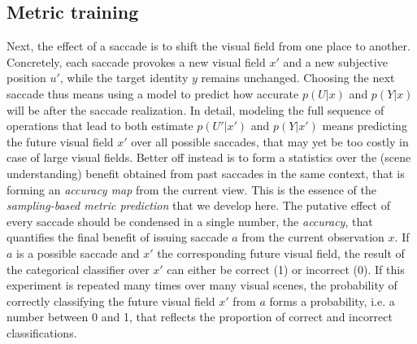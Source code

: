 \subsection*{Metric training}
Next, the effect of a saccade is to shift the visual field from one place to another.
Concretely, each saccade provokes a new visual field $x'$ and a new subjective position $u'$, while the target identity $y$ remains unchanged. 
Choosing the next saccade thus means using a model to predict how accurate $p(U|x)$ and $p(Y|x)$ will be after the saccade realization.
In detail, modeling the full sequence of operations that lead to both estimate $p(U'|x')$ and $p(Y|x')$ means predicting the future visual field $x'$ over all possible saccades, that may yet be too costly in case of large visual fields. 
Better off instead is to form a statistics over the (scene understanding) benefit obtained from past saccades in the same context, that is forming an \emph{accuracy map} from the current view. This is the essence of the \emph{sampling-based metric prediction} that we develop here. The putative effect of every saccade should be condensed in a single number, the \emph{accuracy}, that quantifies the final benefit of issuing saccade $a$ %
from the current observation $x$. If $a$ is a possible saccade and $x'$ the corresponding future visual field, the result of the categorical classifier over $x'$ can either be correct (1) or incorrect (0).
If this experiment is repeated many times over many visual scenes, the probability of correctly classifying the future visual field $x'$ from $a$ forms a probability, i.e. a number between 0 and 1, that reflects the proportion of correct and incorrect classifications.
